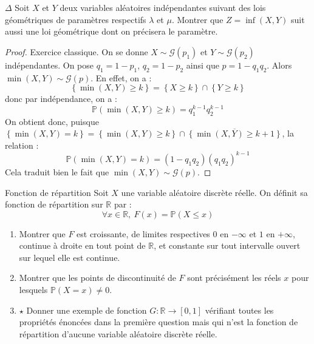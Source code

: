 \documentclass[french,a4paper]{article}
\renewcommand{\P}{\mathbb{P}}
\newcommand{\R}{\mathbb{R}}
\theoremstyle{plain}
\theoremstyle{definition}
\theoremstyle{remark}
\begin{document}
\begin{ex}[Moulin.46]{$\Delta$}
	Soit $X$ et $Y$ deux variables aléatoires indépendantes suivant des lois géométriques de paramètres respectifs $\lambda$ et $\mu$. Montrer que $Z=\inf(X,Y)$ suit aussi une loi géométrique dont on précisera le paramètre.
\end{ex}
\begin{proof}
	Exercice classique. On se donne $X\sim\mathcal{G}(p_1)$ et $Y\sim\mathcal{G}(p_2)$ indépendantes. On pose $q_1=1-p_1$, $q_2=1-p_2$ ainsi que $p=1-q_1q_2$. Alors $\min(X,Y)\sim\mathcal{G}(p)$. En effet, on a : $$\left\{\min(X,Y)\geqslant k\right\}=\left\{X\geqslant k\right\}\cap\left\{Y\geqslant k\right\}$$ donc par indépendance, on a : $$\P(\min(X,Y)\geqslant k)=q_1^{k-1}q_2^{k-1}$$ On obtient donc, puisque $\left\{\min(X,Y)=k\right\}=\left\{\min(X,Y)\geqslant k\right\}\cap\overline{\left\{\min(X,Y)\geqslant k+1\right\}}$, la relation : $$\P(\min(X,Y)=k)=(1-q_1q_2)(q_1q_2)^{k-1}$$ Cela traduit bien le fait que $\min(X,Y)\sim\mathcal{G}(p)$.
\end{proof}

\begin{ex}[Moulin.47]{Fonction de répartition}
	Soit $X$ une variable aléatoire discrète réelle. On définit sa fonction de répartition sur $\R$ par : $$\forall x\in\R,\ F(x)=\P(X\leqslant x)$$
	\begin{enumerate}
		\item Montrer que $F$ est croissante, de limites respectives $0$ en $-\infty$ et $1$ en $+\infty$, continue à droite en tout point de $\R$, et constante sur tout intervalle ouvert sur lequel elle est continue.
		\item Montrer que les points de discontinuité de $F$ sont précisément les réels $x$ pour lesquels $\P(X=x)\ne 0$.
		\item $\star$ Donner une exemple de fonction $G:\R\to[0,1]$ vérifiant toutes les propriétés énoncées dans la première question mais qui n'est la fonction de répartition d'aucune variable aléatoire discrète réelle.
	\end{enumerate}
\end{ex}
\end{document}
